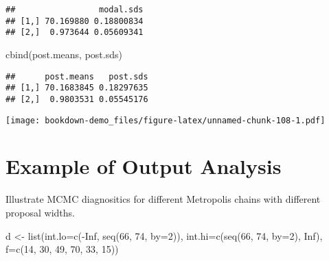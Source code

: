 \documentclass[
]{book}
\newenvironment{Shaded}{\begin{snugshade}}{\end{snugshade}}
\newcommand{\AttributeTok}[1]{\textcolor[rgb]{0.77,0.63,0.00}{#1}}
\newcommand{\ConstantTok}[1]{\textcolor[rgb]{0.00,0.00,0.00}{#1}}
\newcommand{\DecValTok}[1]{\textcolor[rgb]{0.00,0.00,0.81}{#1}}
\newcommand{\FloatTok}[1]{\textcolor[rgb]{0.00,0.00,0.81}{#1}}
\newcommand{\FunctionTok}[1]{\textcolor[rgb]{0.00,0.00,0.00}{#1}}
\newcommand{\NormalTok}[1]{#1}
\newcommand{\OtherTok}[1]{\textcolor[rgb]{0.56,0.35,0.01}{#1}}
\newcommand{\SpecialCharTok}[1]{\textcolor[rgb]{0.00,0.00,0.00}{#1}}
\newcommand{\StringTok}[1]{\textcolor[rgb]{0.31,0.60,0.02}{#1}}
\begin{document}
\begin{verbatim}
##                 modal.sds
## [1,] 70.169880 0.18800834
## [2,]  0.973644 0.05609341
\end{verbatim}

\begin{Shaded}
\begin{Highlighting}[]
\FunctionTok{cbind}\NormalTok{(post.means, post.sds)}
\end{Highlighting}
\end{Shaded}

\begin{verbatim}
##      post.means   post.sds
## [1,] 70.1683845 0.18297635
## [2,]  0.9803531 0.05545176
\end{verbatim}

\begin{Shaded}
\end{Shaded}

\texttt{[image: bookdown-demo\_files/figure-latex/unnamed-chunk-108-1.pdf]}

\hypertarget{example-of-output-analysis}{%
\section{Example of Output Analysis}\label{example-of-output-analysis}}

Illustrate MCMC diagnositics for different Metropolis chains with different proposal widths.

\begin{Shaded}
\begin{Highlighting}[]
\NormalTok{d }\OtherTok{\textless{}{-}} \FunctionTok{list}\NormalTok{(}\AttributeTok{int.lo=}\FunctionTok{c}\NormalTok{(}\SpecialCharTok{{-}}\ConstantTok{Inf}\NormalTok{, }\FunctionTok{seq}\NormalTok{(}\DecValTok{66}\NormalTok{, }\DecValTok{74}\NormalTok{, }\AttributeTok{by=}\DecValTok{2}\NormalTok{)),}
        \AttributeTok{int.hi=}\FunctionTok{c}\NormalTok{(}\FunctionTok{seq}\NormalTok{(}\DecValTok{66}\NormalTok{, }\DecValTok{74}\NormalTok{, }\AttributeTok{by=}\DecValTok{2}\NormalTok{), }\ConstantTok{Inf}\NormalTok{),}
        \AttributeTok{f=}\FunctionTok{c}\NormalTok{(}\DecValTok{14}\NormalTok{, }\DecValTok{30}\NormalTok{, }\DecValTok{49}\NormalTok{, }\DecValTok{70}\NormalTok{, }\DecValTok{33}\NormalTok{, }\DecValTok{15}\NormalTok{))}
\end{Highlighting}
\end{Shaded}
\end{document}

